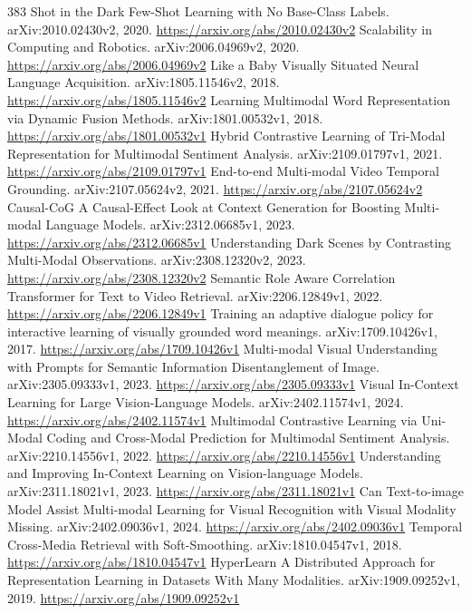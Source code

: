 \documentclass[11pt]{article}
\begin{document}
\begin{thebibliography}{383}
 Shot in the Dark Few-Shot Learning with No Base-Class Labels. arXiv:2010.02430v2, 2020. \url{https://arxiv.org/abs/2010.02430v2}
 Scalability in Computing and Robotics. arXiv:2006.04969v2, 2020. \url{https://arxiv.org/abs/2006.04969v2}
 Like a Baby Visually Situated Neural Language Acquisition. arXiv:1805.11546v2, 2018. \url{https://arxiv.org/abs/1805.11546v2}
 Learning Multimodal Word Representation via Dynamic Fusion Methods. arXiv:1801.00532v1, 2018. \url{https://arxiv.org/abs/1801.00532v1}
 Hybrid Contrastive Learning of Tri-Modal Representation for Multimodal Sentiment Analysis. arXiv:2109.01797v1, 2021. \url{https://arxiv.org/abs/2109.01797v1}
 End-to-end Multi-modal Video Temporal Grounding. arXiv:2107.05624v2, 2021. \url{https://arxiv.org/abs/2107.05624v2}
 Causal-CoG A Causal-Effect Look at Context Generation for Boosting Multi-modal Language Models. arXiv:2312.06685v1, 2023. \url{https://arxiv.org/abs/2312.06685v1}
 Understanding Dark Scenes by Contrasting Multi-Modal Observations. arXiv:2308.12320v2, 2023. \url{https://arxiv.org/abs/2308.12320v2}
 Semantic Role Aware Correlation Transformer for Text to Video Retrieval. arXiv:2206.12849v1, 2022. \url{https://arxiv.org/abs/2206.12849v1}
 Training an adaptive dialogue policy for interactive learning of visually grounded word meanings. arXiv:1709.10426v1, 2017. \url{https://arxiv.org/abs/1709.10426v1}
 Multi-modal Visual Understanding with Prompts for Semantic Information Disentanglement of Image. arXiv:2305.09333v1, 2023. \url{https://arxiv.org/abs/2305.09333v1}
 Visual In-Context Learning for Large Vision-Language Models. arXiv:2402.11574v1, 2024. \url{https://arxiv.org/abs/2402.11574v1}
 Multimodal Contrastive Learning via Uni-Modal Coding and Cross-Modal Prediction for Multimodal Sentiment Analysis. arXiv:2210.14556v1, 2022. \url{https://arxiv.org/abs/2210.14556v1}
 Understanding and Improving In-Context Learning on Vision-language Models. arXiv:2311.18021v1, 2023. \url{https://arxiv.org/abs/2311.18021v1}
 Can Text-to-image Model Assist Multi-modal Learning for Visual Recognition with Visual Modality Missing. arXiv:2402.09036v1, 2024. \url{https://arxiv.org/abs/2402.09036v1}
 Temporal Cross-Media Retrieval with Soft-Smoothing. arXiv:1810.04547v1, 2018. \url{https://arxiv.org/abs/1810.04547v1}
 HyperLearn A Distributed Approach for Representation Learning in Datasets With Many Modalities. arXiv:1909.09252v1, 2019. \url{https://arxiv.org/abs/1909.09252v1}

\end{thebibliography}
\end{document}
